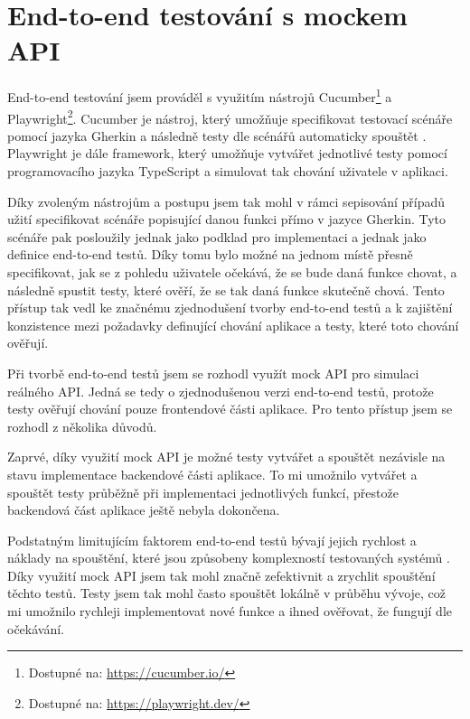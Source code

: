 \section{End-to-end testování s mockem API}

End-to-end testování jsem prováděl s využitím nástrojů Cucumber\footnote{Dostupné na: \href{https://cucumber.io/}{https://cucumber.io/}} a Playwright\footnote{Dostupné na: \href{https://playwright.dev/}{https://playwright.dev/}}. Cucumber je nástroj, který umožňuje specifikovat testovací scénáře pomocí jazyka Gherkin a následně testy dle scénářů automaticky spouštět \cite{CucumberDocs}. Playwright je dále framework, který umožňuje vytvářet jednotlivé testy pomocí programovacího jazyka TypeScript a simulovat tak chování uživatele v aplikaci.

Díky zvoleným nástrojům a postupu jsem tak mohl v rámci sepisování případů užití specifikovat scénáře popisující danou funkci přímo v jazyce Gherkin. Tyto scénáře pak posloužily jednak jako podklad pro implementaci a jednak jako definice end-to-end testů. Díky tomu bylo možné na jednom místě přesně specifikovat, jak se z pohledu uživatele očekává, že se bude daná funkce chovat, a následně spustit testy, které ověří, že se tak daná funkce skutečně chová. Tento přístup tak vedl ke značnému zjednodušení tvorby end-to-end testů a k zajištění konzistence mezi požadavky definující chování aplikace a testy, které toto chování ověřují.

Při tvorbě end-to-end testů jsem se rozhodl využít mock API pro simulaci reálného API. Jedná se tedy o zjednodušenou verzi end-to-end testů, protože testy ověřují chování pouze frontendové části aplikace. Pro tento přístup jsem se rozhodl z několika důvodů.

Zaprvé, díky využití mock API je možné testy vytvářet a spouštět nezávisle na stavu implementace backendové části aplikace. To mi umožnilo vytvářet a spouštět testy průběžně při implementaci jednotlivých funkcí, přestože backendová část aplikace ještě nebyla dokončena.

Podstatným limitujícím faktorem end-to-end testů bývají jejich rychlost a náklady na spouštění, které jsou způsobeny komplexností testovaných systémů \cite{IBMEndToEndTesting}. Díky využití mock API jsem tak mohl značně zefektivnit a zrychlit spouštění těchto testů. Testy jsem tak mohl často spouštět lokálně v průběhu vývoje, což mi umožnilo rychleji implementovat nové funkce a ihned ověřovat, že fungují dle očekávání.


